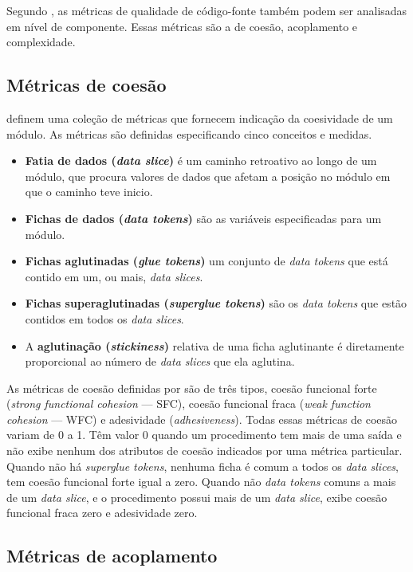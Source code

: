 Segundo , as métricas de qualidade de código-fonte também podem ser analisadas em nível de componente. Essas métricas são a de coesão, acoplamento e complexidade.

\subsection{Métricas de coesão}

 definem uma coleção de métricas que fornecem indicação da coesividade de um módulo. As métricas são definidas especificando cinco conceitos e medidas.

\begin{itemize}
	\item\textbf{Fatia de dados (\textit{data slice})} é um caminho retroativo ao longo de um módulo, que procura valores de dados que afetam a posição no módulo em que o caminho teve inicio.
	\item\textbf{Fichas de dados (\textit{data tokens})} são as variáveis especificadas para um módulo.
	\item\textbf{Fichas aglutinadas (\textit{glue tokens})} um conjunto de \textit{data tokens} que está contido em um, ou mais, \textit{data slices}.
	\item\textbf{Fichas superaglutinadas (\textit{superglue tokens})} são os \textit{data tokens} que estão contidos em todos os \textit{data slices}.
	\item A \textbf{aglutinação (\textit{stickiness})} relativa de uma ficha aglutinante é diretamente proporcional ao número de \textit{data slices} que ela aglutina.
\end{itemize}

As métricas de coesão definidas por  são de três tipos, coesão funcional forte (\textit{strong functional cohesion} --- SFC), coesão funcional fraca (\textit{weak function cohesion} --- WFC) e adesividade (\textit{adhesiveness}). 
Todas essas métricas de coesão variam de 0 a 1. Têm valor 0 quando um procedimento tem mais de uma saída e não exibe nenhum dos atributos de coesão indicados por uma métrica particular. Quando não há \textit{superglue tokens}, nenhuma ficha é comum a todos os \textit{data slices}, tem coesão funcional forte igual a zero. Quando não \textit{data tokens} comuns a mais de um \textit{data slice}, e o procedimento possui mais de um \textit{data slice}, exibe coesão funcional fraca zero e adesividade zero.

\subsection{Métricas de acoplamento}

